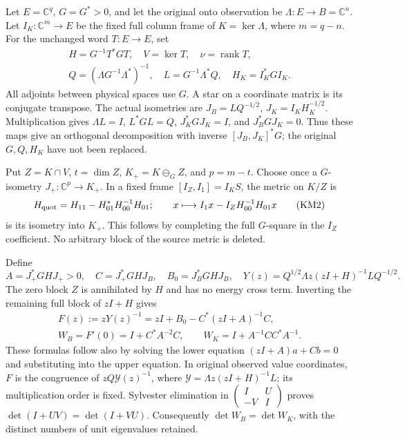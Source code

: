\documentclass[11pt]{article}
\begin{document}
Let \(E=\mathbb C^q\), \(G=G^*>0\), and let the original onto observation be \(\Lambda:E\to B=\mathbb C^n\). Let \(I_K:\mathbb C^m\to E\) be the fixed full column frame of \(K=\ker\Lambda\), where \(m=q-n\). For the unchanged word \(T:E\to E\), set \[
\begin{gathered}
 H=G^{-1}T^*GT,\quad V=\ker T,\quad \nu=\operatorname{rank}T,\\
 Q=(\Lambda G^{-1}\Lambda^*)^{-1},\quad L=G^{-1}\Lambda^*Q,
 \quad H_K=I_K^*GI_K.
 \end{gathered}
 \tag{KM1}
\] All adjoints between physical spaces use \(G\). A star on a coordinate matrix is its conjugate transpose. The actual isometries are \(J_B=LQ^{-1/2}\), \(J_K=I_KH_K^{-1/2}\). Multiplication gives \(\Lambda L=I\), \(L^*GL=Q\), \(J_K^*GJ_K=I\), and \(J_B^*GJ_K=0\). Thus these maps give an orthogonal decomposition with inverse \([J_B,J_K]^*G\); the original \(G,Q,H_K\) have not been replaced.

Put \(Z=K\cap V\), \(t=\dim Z\), \(K_+=K\ominus_GZ\), and \(p=m-t\). Choose once a \(G\)-isometry \(J_+:\mathbb C^p\to K_+\). In a fixed frame \([I_Z,I_1]=I_KS\), the metric on \(K/Z\) is \[
 H_{\rm quot}=H_{11}-H_{01}^*H_{00}^{-1}H_{01};
 \qquad x\longmapsto I_1x-I_ZH_{00}^{-1}H_{01}x
 \tag{KM2}
\] is its isometry into \(K_+\). This follows by completing the full \(G\)-square in the \(I_Z\) coefficient. No arbitrary block of the source metric is deleted.

Define \[
 A=J_+^*GHJ_+>0,\quad C=J_+^*GHJ_B,\quad B_0=J_B^*GHJ_B,
 \quad Y(z)=Q^{1/2}\Lambda z(zI+H)^{-1}LQ^{-1/2}.
\] The zero block \(Z\) is annihilated by \(H\) and has no energy cross term. Inverting the remaining full block of \(zI+H\) gives \[
\begin{gathered}
 F(z):=zY(z)^{-1}=zI+B_0-C^*(zI+A)^{-1}C,\\
 W_B=F'(0)=I+C^*A^{-2}C,\qquad
 W_K=I+A^{-1}CC^*A^{-1}.
 \end{gathered}
 \tag{KM3}
\] These formulas follow also by solving the lower equation \((zI+A)a+Cb=0\) and substituting into the upper equation. In original observed value coordinates, \(F\) is the congruence of \(zQ\mathscr Y(z)^{-1}\), where \(\mathscr Y=\Lambda z(zI+H)^{-1}L\); its multiplication order is fixed. Sylvester elimination in \(\left(\begin{smallmatrix}I&U\\-V&I\end{smallmatrix}\right)\) proves \(\det(I+UV)=\det(I+VU)\). Consequently \(\det W_B=\det W_K\), with the distinct numbers of unit eigenvalues retained.
\end{document}

